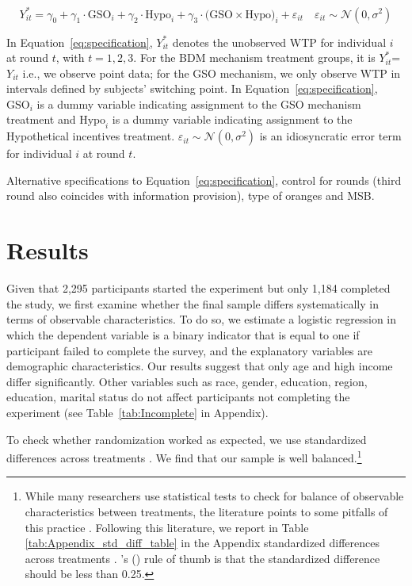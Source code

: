 \documentclass[12pt]{article}
\newcommand\citeapos[1]{\citeauthor{#1}'s (\citeyear{#1})} %
\begin{document}
\begin{equation}\label{eq:specification}
Y_{it}^* = \gamma_0 + \gamma_1 \cdot \text{GSO}_i + \gamma_2 \cdot \text{Hypo}_i + \gamma_3 \cdot \text{(GSO} \times \text{Hypo)}_i +  \varepsilon_{it} 
\quad \varepsilon_{it} \sim \mathcal{N}(0, \sigma^2)
\end{equation}


In Equation~\ref{eq:specification}, $Y_{it}^*$ denotes the unobserved WTP for individual $i$ at round $t$, with $t = 1, 2, 3$. For the BDM mechanism treatment groups, it is  $Y_{it}^*$= $Y_{it}$ i.e., we observe point data; for the GSO mechanism, we only observe WTP in intervals defined by subjects' switching point. In Equation~\ref{eq:specification}, $\text{GSO}_i$ is a dummy variable indicating assignment to the GSO mechanism treatment and $\text{Hypo}_i$ is a dummy variable indicating assignment to the Hypothetical incentives treatment. $\varepsilon_{it} \sim \mathcal{N}(0, \sigma^2)$ is an idiosyncratic error term for individual $i$ at round $t$.

Alternative specifications to Equation~\ref{eq:specification}, control for rounds (third round also coincides with information provision), type of oranges and MSB.

\section{Results}
\label{Results}

Given that 2,295 participants started the experiment but only 1,184 completed the study, we first examine whether the final sample differs systematically in terms of observable characteristics. To do so, we estimate a logistic regression in which the dependent variable is a binary indicator that is equal to one if participant failed to complete the survey, and the explanatory variables are demographic characteristics. Our results suggest that only age and high income differ significantly. Other variables such as race, gender, education, region, education, marital status do not affect participants not completing the experiment (see Table~\ref{tab:Incomplete} in Appendix).

To check whether randomization worked as expected, we use standardized differences across treatments \citep{CochranRubin1973}. We find that our sample is well balanced.\footnote{While many researchers use statistical tests to check for balance of observable characteristics between treatments, the literature points to some pitfalls of this practice \citep[e.g.,][]{canavari2019run,DeatonCartwright2016,BrizEtAl2017,HoEtAl2007,MoherEtAl2010,MutzPemantle2015}. Following this literature, we report in Table \ref{tab:Appendix_std_diff_table} in the Appendix standardized differences across treatments \citep{ImbensRubin2016,ImbensWooldridge2009}. \citeapos{CochranRubin1973} rule of thumb is that the standardized difference should be less than 0.25. }
\end{document}

